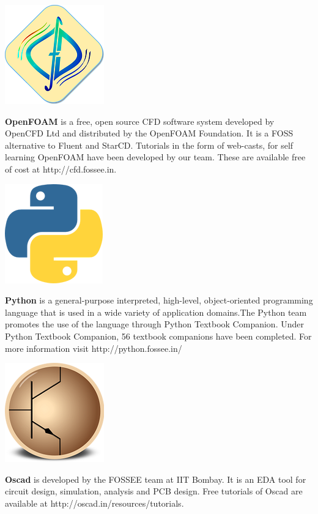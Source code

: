 \documentclass{letter}
\begin{document}
\begin{minipage}[t]{0.48\linewidth} \begin{center}
\includegraphics[width=0.32\linewidth]{images/cfd_logo.png} \end{center}
\textbf{OpenFOAM} is a free, open source CFD software system developed by
OpenCFD Ltd and distributed by the OpenFOAM Foundation. It is a FOSS
alternative to Fluent and StarCD. Tutorials in the form of web-casts,
for self learning OpenFOAM have been developed by our team. These are
available free of cost at
{\color{blue}http://cfd.fossee.in}. \end{minipage}
\hspace{0.04\linewidth}
\begin{minipage}[t]{0.48\linewidth} \begin{center}
\includegraphics[width=0.32\linewidth]{images/python_logo.png} \end{center}
\textbf{Python} is a general-purpose interpreted, high-level, object-oriented
programming language that is used in a wide variety of application domains.The
Python team promotes the use of the language through Python Textbook Companion.
Under Python Textbook Companion, 56 textbook companions have been completed.
For more information visit {\color{blue}http://python.fossee.in/} \end{minipage}

\begin{minipage}[t]{0.48\linewidth} \begin{center}
\includegraphics[width=0.32\linewidth]{images/oscad_logo.png} \end{center}
\textbf{Oscad} is developed by the FOSSEE team at IIT Bombay. It is an EDA tool
for circuit design, simulation, analysis and PCB design. Free tutorials of
Oscad are available at {\color{blue}http://oscad.in/resources/tutorials}.  \end{minipage}
\end{document}
